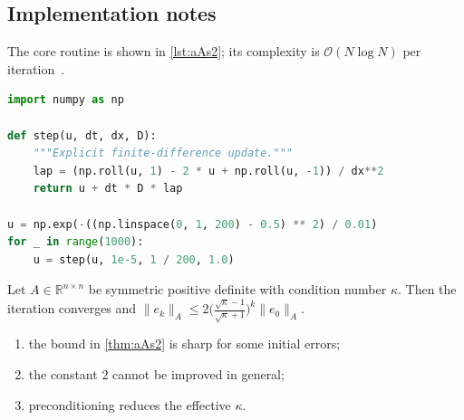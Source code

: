 \lipsum[34-35]

\subsection{Implementation notes}\label{sec:aAs2-i}
The core routine is shown in \cref{lst:aAs2}; its complexity is $\mathcal{O}(N\log N)$ per iteration~\cite{appx-9}.

\begin{lstlisting}[language=python,caption={Reference implementation for aAs2.},label={lst:aAs2}]
import numpy as np

def step(u, dt, dx, D):
    """Explicit finite-difference update."""
    lap = (np.roll(u, 1) - 2 * u + np.roll(u, -1)) / dx**2
    return u + dt * D * lap

u = np.exp(-((np.linspace(0, 1, 200) - 0.5) ** 2) / 0.01)
for _ in range(1000):
    u = step(u, 1e-5, 1 / 200, 1.0)
\end{lstlisting}

\lipsum[111-111]
\begin{theorem}\label{thm:aAs2}
Let $A\in\mathbb{R}^{n\times n}$ be symmetric positive definite with condition number $\kappa$. Then the iteration converges and
$\lVert e_k\rVert_A \le 2\bigl(\tfrac{\sqrt\kappa-1}{\sqrt\kappa+1}\bigr)^k\lVert e_0\rVert_A$.
\end{theorem}
\begin{enumerate}[label=(\roman*)]
\item the bound in \cref{thm:aAs2} is sharp for some initial errors;
\item the constant $2$ cannot be improved in general;
\item preconditioning reduces the effective $\kappa$.
\end{enumerate}

\kant[9-10]
